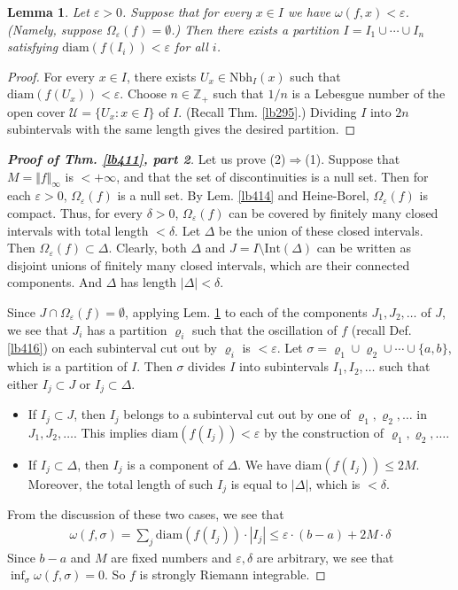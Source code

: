 \documentclass[12pt,b5paper,notitlepage]{article}
\theoremstyle{definition}
\theoremstyle{plain}
\newtheorem{lm}[df]{Lemma}
\newcommand{\mc}{\mathcal}
\newcommand{\Zbb}{\mathbb Z}
\newcommand{\Int}{\mathrm{Int}}
\newcommand{\Nbh}{\mathrm{Nbh}}
\newcommand{\diam}{\mathrm{diam}}
\newcommand{\eps}{\varepsilon}
\numberwithin{equation}{section}
\begin{document}
\begin{lm}\label{lb415}
Let $\eps>0$. Suppose that for every $x\in I$ we have $\omega(f,x)<\eps$. (Namely, suppose $\Omega_\eps(f)=\emptyset$.) Then there exists a partition $I=I_1\cup\cdots\cup I_n$ satisfying $\diam(f(I_i))<\eps$ for all $i$.
\end{lm}


\begin{proof}
For every $x\in I$, there exists $U_x\in\Nbh_I(x)$ such that $\diam(f(U_x))<\eps$. Choose $n\in\Zbb_+$ such that $1/n$ is a Lebesgue number of the open cover $\mc U=\{U_x:x\in I\}$ of $I$. (Recall Thm. \ref{lb295}.) Dividing $I$ into $2n$ subintervals with the same length gives the desired partition.
\end{proof}


\begin{proof}[\textbf{Proof of Thm. \ref{lb411}, part 2}]
Let us prove (2)$\Rightarrow$(1). Suppose that $M=\Vert f\Vert_\infty$ is $<+\infty$, and that the set of discontinuities is a null set. Then for each $\eps>0$, $\Omega_\eps(f)$ is a null set. By Lem. \ref{lb414} and Heine-Borel, $\Omega_\eps(f)$ is compact. Thus, for every $\delta>0$, $\Omega_\eps(f)$ can be covered by finitely many closed intervals with total length $<\delta$. Let $\Delta$ be the union of these closed intervals. Then $\Omega_\eps(f)\subset\Delta$. Clearly, both $\Delta$ and $J=I\setminus\Int(\Delta)$ can be written as disjoint unions of finitely many closed intervals, which are their connected components. And $\Delta$ has length $|\Delta|<\delta$.

Since $J\cap\Omega_\eps(f)=\emptyset$, applying Lem. \ref{lb415} to each of the components $J_1,J_2,\dots$ of $J$, we see that $J_i$ has a partition $\varrho_i$ such that the oscillation of $f$ (recall Def. \ref{lb416}) on each subinterval cut out by $\varrho_i$  is $<\eps$. Let $\sigma=\varrho_1\cup\varrho_2\cup\cdots\cup\{a,b\}$, which is a partition of $I$. Then $\sigma$ divides $I$ into subintervals $I_1,I_2,\dots$ such that either $I_j\subset J$ or $I_j\subset\Delta$.
\begin{itemize}
\item If $I_j\subset J$, then $I_j$ belongs to a subinterval cut out by one of $\varrho_1,\varrho_2,\dots$ in $J_1,J_2,\dots$. This implies $\diam(f(I_j))<\eps$ by the construction of $\varrho_1,\varrho_2,\dots$.
\item If $I_j\subset\Delta$, then $I_j$ is a component of $\Delta$. We have $\diam(f(I_j))\leq 2M$. Moreover, the total length of such $I_j$ is equal to $|\Delta|$, which is $<\delta$.
\end{itemize}
From the discussion of these two cases, we see that 
\begin{align*}
\omega(f,\sigma)=\sum_j\diam(f(I_j))\cdot|I_j|\leq \eps\cdot (b-a)+2M\cdot\delta
\end{align*}
Since $b-a$ and $M$ are fixed numbers and $\eps,\delta$ are arbitrary, we see that $\inf_{\sigma}\omega(f,\sigma)=0$. So $f$ is strongly Riemann integrable.
\end{proof}
\end{document}
